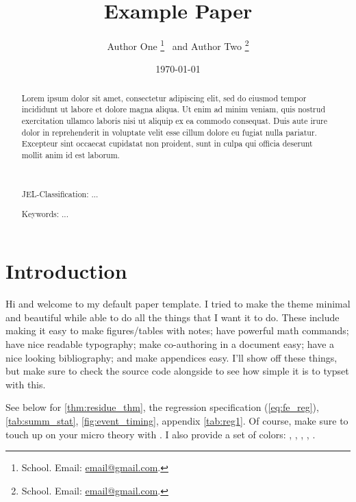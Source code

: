 \documentclass[12pt]{article}
\title{Example Paper}
\author{
  Author One%
  \thanks{School. Email: \href{mailto:email@gmail.com}{email@gmail.com}.} \ and Author Two%
  \thanks{School. Email: \href{mailto:email@gmail.com}{email@gmail.com}.}
}
\date{\today}
\newcommand{\kyle}[1]{\iftoggle{INCLUDECOMMENTS}{
  \orange{\textbf{Kyle:} #1}
}{}}
\begin{document}
\maketitle
\begin{abstract}
  Lorem ipsum dolor sit amet, consectetur adipiscing elit, sed do eiusmod tempor incididunt ut labore et dolore magna aliqua. Ut enim ad minim veniam, quis nostrud exercitation ullamco laboris nisi ut aliquip ex ea commodo consequat. Duis aute irure dolor in reprehenderit in voluptate velit esse cillum dolore eu fugiat nulla pariatur. Excepteur sint occaecat cupidatat non proident, sunt in culpa qui officia deserunt mollit anim id est laborum.

  \par~\par\noindent
  {\color{asher}JEL-Classification:} ...
  \par\noindent
  {\color{asher}Keywords:} ...
  \par\vspace{-2.5mm}
\end{abstract}

\newpage


\section{Introduction}

Hi and welcome to my default paper template. I tried to make the theme minimal and beautiful while able to do all the things that I want it to do. These include making it easy to make figures/tables with notes; have powerful math commands; have nice readable typography; make co-authoring in a document easy; have a nice looking bibliography; and make appendices easy.\kyle{I'm including this comment for coauthors. If I switch above to \texttt{togglefalse}, this will dissapear.}  I'll show off these things, but make sure to check the source code alongside to see how simple it is to typset with this. 

See below for \autoref{thm:residue_thm}, the regression specification (\autoref{eq:fe_reg}), \autoref{tab:summ_stat}, \autoref{fig:event_timing}, appendix \autoref{tab:reg1}. Of course, make sure to touch up on your micro theory with \citet{mas1995microeconomic}. I also provide a set of colors: , , , , .
\end{document}
